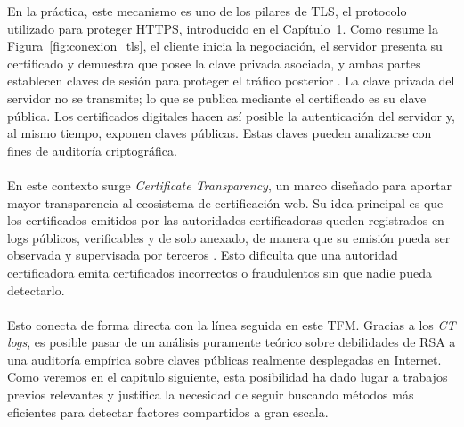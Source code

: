 En la práctica, este mecanismo es uno de los pilares de TLS, el protocolo utilizado para proteger HTTPS, introducido en el Capítulo~1. Como resume la Figura~\ref{fig:conexion_tls}, el cliente inicia la negociación, el servidor presenta su certificado y demuestra que posee la clave privada asociada, y ambas partes establecen claves de sesión para proteger el tráfico posterior \citep{rfc8446}. La clave privada del servidor no se transmite; lo que se publica mediante el certificado es su clave pública. Los certificados digitales hacen así posible la autenticación del servidor y, al mismo tiempo, exponen claves públicas. Estas claves pueden analizarse con fines de auditoría criptográfica.
\\
\\
En este contexto surge \textit{Certificate Transparency}, un marco diseñado para aportar mayor transparencia al ecosistema de certificación web. Su idea principal es que los certificados emitidos por las autoridades certificadoras queden registrados en logs públicos, verificables y de solo anexado, de manera que su emisión pueda ser observada y supervisada por terceros \citep{rfc9162}. Esto dificulta que una autoridad certificadora emita certificados incorrectos o fraudulentos sin que nadie pueda detectarlo.
\\
\\
Esto conecta de forma directa con la línea seguida en este TFM. Gracias a los \textit{CT logs}, es posible pasar de un análisis puramente teórico sobre debilidades de RSA a una auditoría empírica sobre claves públicas realmente desplegadas en Internet. Como veremos en el capítulo siguiente, esta posibilidad ha dado lugar a trabajos previos relevantes y justifica la necesidad de seguir buscando métodos más eficientes para detectar factores compartidos a gran escala.
